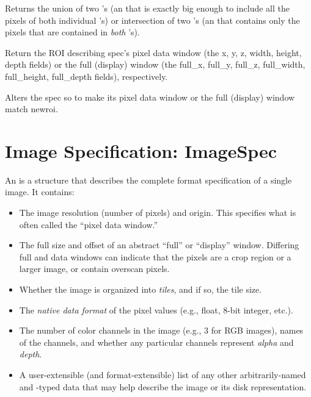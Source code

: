 Returns the union of two \ROI's (an \ROI that is exactly big enough
to include all the pixels of both individual \ROI's) or intersection
of two \ROI's (an \ROI that contains only the pixels that are contained
in \emph{both} \ROI's).
\apiend

Return the ROI describing {\cf spec}'s pixel data window (the {\cf x, y, z,
width, height, depth} fields)
or the full (display) window (the {\cf full_x, full_y, full_z,
full_width, full_height, full_depth} fields), respectively.
\apiend

Alters the {\cf spec} so to make its pixel data window 
or the full (display) window match {\cf newroi}.
\apiend


\section{Image Specification: {\cf ImageSpec}}
\label{sec:ImageSpec}

An \ImageSpec is a structure that describes the complete
format specification of a single image.  It contains:

\begin{itemize}
\item The image resolution (number of pixels) and origin. This specifies
  what is often called the ``pixel data window.''
\item The full size and offset of an abstract ``full'' or ``display''
  window. Differing full and data windows can indicate that the pixels
  are a crop region or a larger image, or contain overscan pixels.
\item Whether the image is organized into \emph{tiles}, and if so, the
  tile size.
\item The \emph{native data format} of the pixel values (e.g., float, 8-bit
  integer, etc.).
\item The number of color channels in the image (e.g., 3 for RGB
  images), names of the channels, and whether any particular channels
  represent \emph{alpha} and \emph{depth}.
\item A user-extensible (and format-extensible) list of any other
  arbitrarily-named and -typed data that may help describe the image or
  its disk representation.
\end{itemize}

